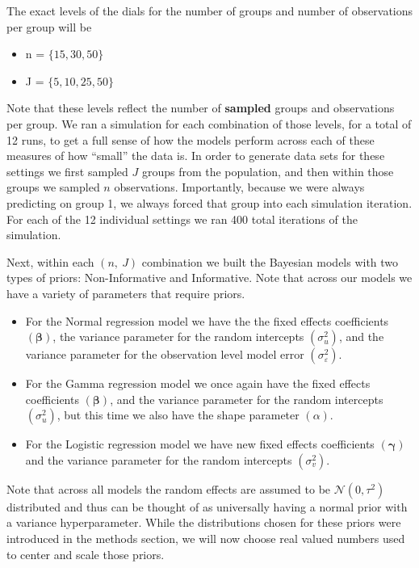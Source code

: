 \documentclass[12pt,twoside]{reedthesis}
\providecommand{\tightlist}{%
  \setlength{\itemsep}{0pt}\setlength{\parskip}{0pt}}
\begin{document}
The exact levels of the dials for the number of groups and number of observations per group will be
\begin{itemize}
\tightlist
\item
  n = \(\{15, 30, 50\}\)
\item
  J = \(\{5, 10, 25, 50\}\)
\end{itemize}
Note that these levels reflect the number of \textbf{sampled} groups and observations per group. We ran a simulation for each combination of those levels, for a total of 12 runs, to get a full sense of how the models perform across each of these measures of how ``small'' the data is. In order to generate data sets for these settings we first sampled \(J\) groups from the population, and then within those groups we sampled \(n\) observations. Importantly, because we were always predicting on group 1, we always forced that group into each simulation iteration. For each of the 12 individual settings we ran 400 total iterations of the simulation.

Next, within each \((n,\ J)\) combination we built the Bayesian models with two types of priors: Non-Informative and Informative. Note that across our models we have a variety of parameters that require priors.
\begin{itemize}
\item
  For the Normal regression model we have the the fixed effects coefficients \((\boldsymbol{\beta})\), the variance parameter for the random intercepts \((\sigma_u^2)\), and the variance parameter for the observation level model error \((\sigma_{\varepsilon}^2)\).
\item
  For the Gamma regression model we once again have the fixed effects coefficients \((\boldsymbol{\beta})\), and the variance parameter for the random intercepts \((\sigma_u^2)\), but this time we also have the shape parameter \((\alpha)\).
\item
  For the Logistic regression model we have new fixed effects coefficients \((\boldsymbol{\gamma})\) and the variance parameter for the random intercepts \((\sigma_v^2)\).
\end{itemize}
Note that across all models the random effects are assumed to be \(\mathcal{N}(0, \tau^2)\) distributed and thus can be thought of as universally having a normal prior with a variance hyperparameter. While the distributions chosen for these priors were introduced in the methods section, we will now choose real valued numbers used to center and scale those priors.
\end{document}
